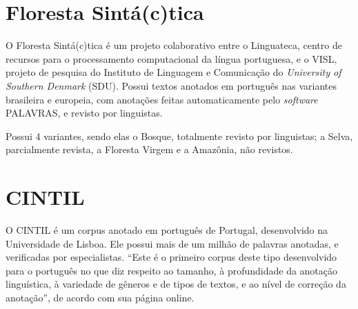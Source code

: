 \section{Floresta Sintá(c)tica}
O Floresta Sintá(c)tica é um projeto colaborativo entre o Linguateca, centro de recursos para o processamento computacional da língua portuguesa, e o VISL, projeto de pesquisa do Instituto de Linguagem e Comunicação do \textit{University of Southern Denmark} (SDU). Possui textos anotados em português nas variantes brasileira e europeia, com anotações feitas automaticamente pelo \textit{software} PALAVRAS, e revisto por linguistas. 

Possui 4 variantes, sendo elas o Bosque, totalmente revisto por linguistas; a Selva, parcialmente revista, a Floresta Virgem e a Amazônia, não revistos. 

\section{CINTIL} \label{CINTIL}
O CINTIL é um corpus anotado em português de Portugal, desenvolvido na Universidade de Lisboa. Ele possui mais de um milhão de palavras anotadas, e verificadas por especialistas. 
``Este é o primeiro corpus deste tipo desenvolvido para o português no que diz respeito ao tamanho, à profundidade da anotação linguística, à variedade de gêneros e de tipos de textos, e ao nível de correção da anotação'', de acordo com sua página online.
